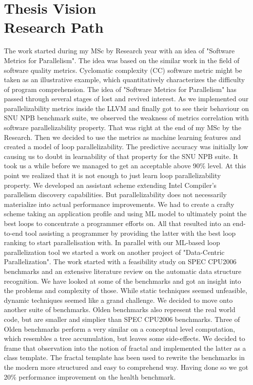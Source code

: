 \documentclass[10pt,a4paper]{report}
\begin{document}
\chapter{Thesis Vision\\{\Large Research Path}}
\quad The work started during my MSc by Research year with an idea of "Software Metrics for Parallelism". The idea was based on the similar work in the field of software quality metrics. Cyclomatic complexity (CC) software metric might be taken as an illustrative example, which quantitatively characterizes the difficulty of program comprehension. The idea of "Software Metrics for Parallelism" has passed through several stages of lost and revived interest. As we implemented our parallelizability metrics inside the LLVM and finally got to see their behaviour on SNU NPB benchmark suite, we observed the weakness of metrics correlation with software parallelizability property. That was right at the end of my MSc by the Research. Then we decided to use the metrics as machine learning features and created a model of loop parallelizability. The predictive accuracy was initially low causing us to doubt in learnability of that property for the SNU NPB suite. It took us a while before we managed to get an acceptable above 90\% level. At this point we realized that it is not enough to just learn loop parallelizability property. We developed an assistant scheme extending Intel Compiler's parallelism discovery capabilities. But parallelizability does not necessarily materialize into actual performance improvements. We had to create a crafty scheme taking an application profile and using ML model to ultimately point the best loops to concentrate a programmer efforts on. All that resulted into an end-to-end tool assisting a programmer by providing the latter with the best loop ranking to start parallelisation with.\newline\null
\quad In parallel with our ML-based loop parallelization tool we started a work on another project of "Data-Centric Parallelization". The work started with a feasibility study on SPEC CPU2006 benchmarks and an extensive literature review on the automatic data structure recognition. We have looked at some of the benchmarks and got an insight into the problems and complexity of those. While static techniques seemed unfeasible, dynamic techniques seemed like a grand challenge. We decided to move onto another suite of benchmarks. Olden benchmarks also represent the real world code, but are smaller and simplier than SPEC CPU2006 benchmarks. Three of Olden benchmarks perform a very similar on a conceptual level computation, which resembles a tree accumulation, but leaves some side-effects. We decided to frame that observation into the notion of fractal and implemented the latter as a class template. The fractal template has been used to rewrite the benchmarks in the modern more structured and easy to comprehend way. Having done so we got 20\% performance improvement on the health benchmark.      
\end{document}

